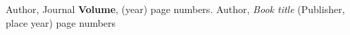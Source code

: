 %
%
%


%
% 
% 
%
\begin{thebibliography}{}
%
%
Author, Journal \textbf{Volume}, (year) page numbers.
Author, \textit{Book title} (Publisher, place year) page numbers
\end{thebibliography}





